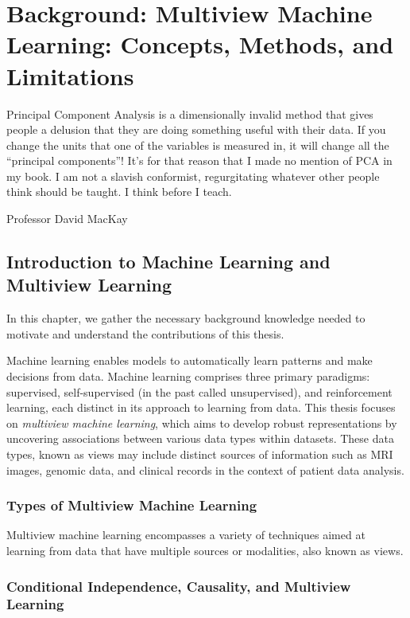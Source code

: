\graphicspath{{chapters/background/}}
\chapter{Background: Multiview Machine Learning: Concepts, Methods, and Limitations}\label{chap:background}
\minitoc
\epigraph{Principal Component Analysis is a dimensionally invalid method that gives people a delusion that they are doing something useful with their data. If you change the units that one of the variables is measured in, it will change all the “principal components”! It’s for that reason that I made no mention of PCA in my book. I am not a slavish conformist, regurgitating whatever other people think should be taught. I think before I teach.}{Professor David MacKay}
\section{Introduction to Machine Learning and Multiview Learning}

In this chapter, we gather the necessary background knowledge needed to motivate and understand the contributions of this thesis.

Machine learning enables models to automatically learn patterns and make decisions from data.
Machine learning comprises three primary paradigms: supervised, self-supervised (in the past called unsupervised), and reinforcement learning, each distinct in its approach to learning from data.
This thesis focuses on \textit{multiview machine learning}, which aims to develop robust representations by uncovering associations between various data types within datasets.
These data types, known as \gls{views} may include distinct sources of information such as MRI images, genomic data, and clinical records in the context of patient data analysis.

\subsection{Types of Multiview Machine Learning}

Multiview machine learning encompasses a variety of techniques aimed at learning from data that have multiple sources or modalities, also known as \gls{views}.

\subsection{Conditional Independence, Causality, and Multiview Learning}

